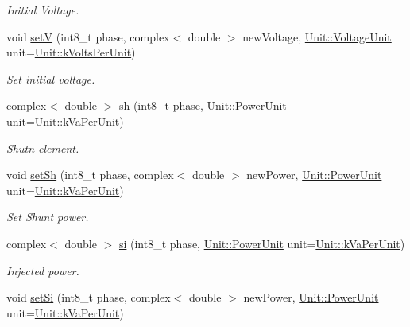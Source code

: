\begin{DoxyCompactItemize}
\begin{DoxyCompactList}\small\item\em Initial Voltage. \end{DoxyCompactList}\item 
void \hyperlink{group___models_ga8d1e70b2d11ed4245e81b8b20858079d}{set\+V} (int8\+\_\+t phase, complex$<$ double $>$ new\+Voltage, \hyperlink{class_unit_a55b07dfa9457e1eca2c7194fe0cfc3c1}{Unit\+::\+Voltage\+Unit} unit=\hyperlink{class_unit_a55b07dfa9457e1eca2c7194fe0cfc3c1ab44b1310b59fdcdc9df5bbea91da4206}{Unit\+::k\+Volts\+Per\+Unit})
\begin{DoxyCompactList}\small\item\em Set initial voltage. \end{DoxyCompactList}\item 
complex$<$ double $>$ \hyperlink{group___models_gac020fff2f22a9caab71f21205b5773f8}{sh} (int8\+\_\+t phase, \hyperlink{class_unit_ace265ae255370ccacfd5370337572c3b}{Unit\+::\+Power\+Unit} unit=\hyperlink{class_unit_ace265ae255370ccacfd5370337572c3bae056e80d620a87c61a44c359e6b05cc1}{Unit\+::k\+Va\+Per\+Unit})
\begin{DoxyCompactList}\small\item\em Shutn element. \end{DoxyCompactList}\item 
void \hyperlink{group___models_gafd91c7f15566b9d5a68a197efeaeaf26}{set\+Sh} (int8\+\_\+t phase, complex$<$ double $>$ new\+Power, \hyperlink{class_unit_ace265ae255370ccacfd5370337572c3b}{Unit\+::\+Power\+Unit} unit=\hyperlink{class_unit_ace265ae255370ccacfd5370337572c3bae056e80d620a87c61a44c359e6b05cc1}{Unit\+::k\+Va\+Per\+Unit})
\begin{DoxyCompactList}\small\item\em Set Shunt power. \end{DoxyCompactList}\item 
complex$<$ double $>$ \hyperlink{group___models_ga9af07eb85c2c76eb3bc73e25bb842c1e}{si} (int8\+\_\+t phase, \hyperlink{class_unit_ace265ae255370ccacfd5370337572c3b}{Unit\+::\+Power\+Unit} unit=\hyperlink{class_unit_ace265ae255370ccacfd5370337572c3bae056e80d620a87c61a44c359e6b05cc1}{Unit\+::k\+Va\+Per\+Unit})
\begin{DoxyCompactList}\small\item\em Injected power. \end{DoxyCompactList}\item 
void \hyperlink{group___models_ga85e2a9b8a281900333fd65d1b532acfd}{set\+Si} (int8\+\_\+t phase, complex$<$ double $>$ new\+Power, \hyperlink{class_unit_ace265ae255370ccacfd5370337572c3b}{Unit\+::\+Power\+Unit} unit=\hyperlink{class_unit_ace265ae255370ccacfd5370337572c3bae056e80d620a87c61a44c359e6b05cc1}{Unit\+::k\+Va\+Per\+Unit})

\end{DoxyCompactItemize}
